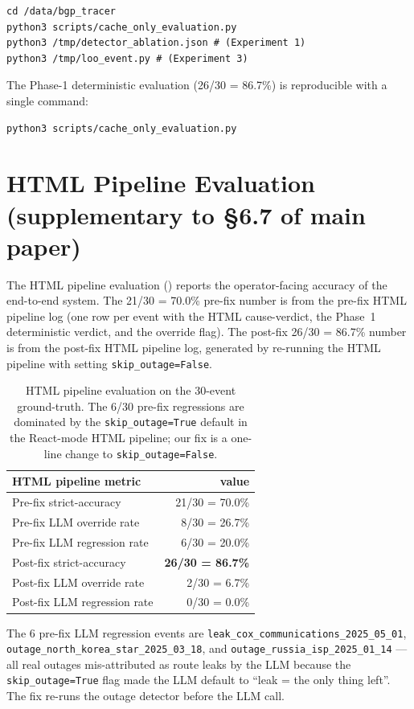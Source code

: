 \documentclass[sigcomm,nonatbib]{acmart}
\begin{document}
\begin{verbatim}
cd /data/bgp_tracer
python3 scripts/cache_only_evaluation.py
python3 /tmp/detector_ablation.json # (Experiment 1)
python3 /tmp/loo_event.py # (Experiment 3)
\end{verbatim}

The Phase-1 deterministic evaluation (26/30 = 86.7\%) is
reproducible with a single command:
\begin{verbatim}
python3 scripts/cache_only_evaluation.py
\end{verbatim}

\section{HTML Pipeline Evaluation (supplementary to \S6.7 of main paper)}
\label{sec:supp-html}

The HTML pipeline evaluation () reports
the operator-facing accuracy of the end-to-end system. The
21/30 = 70.0\% pre-fix number is from the
pre-fix HTML pipeline log
(one row per event with the HTML cause-verdict, the Phase~1
deterministic verdict, and the override flag). The
post-fix 26/30 = 86.7\% number is from the
post-fix HTML pipeline log,
generated by re-running the HTML pipeline with
setting \texttt{skip\_outage=False}.

\begin{table}[t][h]
\centering\small
\begin{tabular}{lr}
\hline
HTML pipeline metric & value \\ \hline
Pre-fix strict-accuracy & 21/30 = 70.0\% \\
Pre-fix LLM override rate & 8/30 = 26.7\% \\
Pre-fix LLM regression rate & 6/30 = 20.0\% \\
Post-fix strict-accuracy & \textbf{26/30 = 86.7\%} \\
Post-fix LLM override rate & 2/30 = 6.7\% \\
Post-fix LLM regression rate & 0/30 = 0.0\% \\
\hline
\end{tabular}
\caption{HTML pipeline evaluation on the 30-event
ground-truth. The 6/30
pre-fix regressions are dominated by
the \texttt{skip\_outage=True} default in the React-mode HTML
pipeline; our fix is a one-line change to
\texttt{skip\_outage=False}.}
\label{tab:supp-html}
\end{table}

The 6 pre-fix LLM regression events are
\texttt{leak\_cox\_communications\_2025\_05\_01},
\texttt{outage\_north\_korea\_star\_2025\_03\_18}, and
\texttt{outage\_russia\_isp\_2025\_01\_14} --- all real outages
mis-attributed as route leaks by the LLM because the
\texttt{skip\_outage=True} flag made the LLM
default to ``leak = the only thing left''. The
fix re-runs the outage detector before the LLM call.
\end{document}
